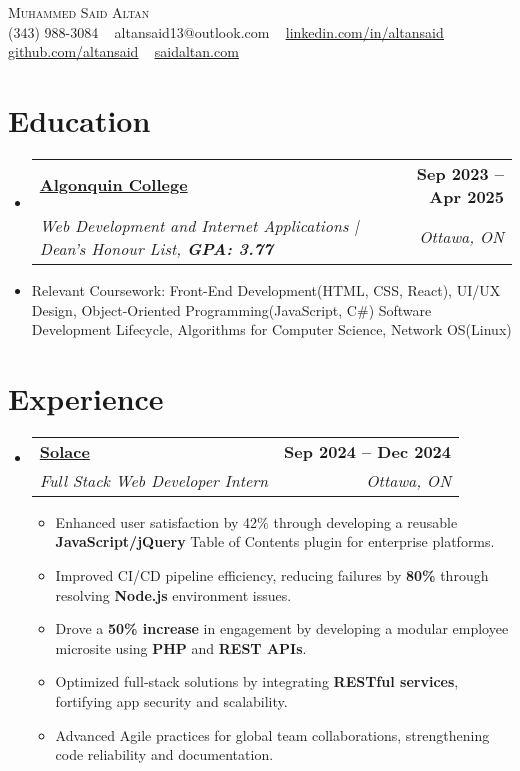 \documentclass[letterpaper, 10pt]{article}
\makeatletter
\newcommand{\resumeItem}[1]{\item\small{{#1 \vspace{0pt}}}}
\newcommand{\resumeSubheading}[4]{
  \vspace{-2pt}\item
    \begin{tabular*}{1.0\textwidth}[t]{l@{\extracolsep{\fill}}r}
      \textbf{#1} & \textbf{\small #2} \\
      \textit{\small#3} & \textit{\small #4} \\
    \end{tabular*}\vspace{-7pt}
}
\newcommand{\resumeItemListStart}{\begin{itemize}}
\newcommand{\resumeItemListEnd}{\end{itemize}\vspace{-5pt}}
\newcommand{\resumeSubHeadingListStart}{\begin{itemize}[leftmargin=0.0in, label={}]}
\newcommand{\resumeSubHeadingListEnd}{\end{itemize}}
\makeatother
\begin{document}
\begin{center}
    {\Large \scshape Muhammed Said Altan} \\[2mm]
    \footnotesize
    (343) 988-3084 ~ 
    altansaid13@outlook.com ~ 
    \underline{\href{https://www.linkedin.com/in/altansaid/}{linkedin.com/in/altansaid}} ~ 
    \underline{\href{https://github.com/altansaid}{github.com/altansaid}} ~ 
    \underline{\href{https://saidaltan.com?utm_source=canonical\&utm_medium=resume\&utm_campaign=job_application}{saidaltan.com}}
    \vspace{-10pt}
\end{center}

\section{Education}
  \resumeSubHeadingListStart
    \resumeSubheading
      {\href{https://www.algonquincollege.com/sat/program/web-development-internet-applications/}{Algonquin College}}{Sep 2023 -- Apr 2025}
      {Web Development and Internet Applications | Dean's Honour List, \textbf{GPA: 3.77}}{Ottawa, ON}
      \resumeItem{Relevant Coursework: Front-End Development(HTML, CSS, React), UI/UX Design, Object-Oriented Programming(JavaScript, C\#) Software Development Lifecycle, Algorithms for Computer Science, Network OS(Linux)} 
  \resumeSubHeadingListEnd
\vspace{-10pt}

\section{Experience}
\resumeSubHeadingListStart
\resumeSubheading
{\href{https://solace.com/}{Solace}}{Sep 2024 -- Dec 2024}{Full Stack Web Developer Intern}{Ottawa, ON}
\resumeItemListStart
\resumeItem{Enhanced user satisfaction by 42\% through developing a reusable \textbf{JavaScript/jQuery} Table of Contents plugin for enterprise platforms.}
\resumeItem{Improved CI/CD pipeline efficiency, reducing failures by \textbf{80\%} through resolving \textbf{Node.js} environment issues.}
\resumeItem{Drove a \textbf{50\% increase} in engagement by developing a modular employee microsite using \textbf{PHP} and \textbf{REST APIs}.}
\resumeItem{Optimized full-stack solutions by integrating \textbf{RESTful services}, fortifying app security and scalability.}
\resumeItem{Advanced Agile practices for global team collaborations, strengthening code reliability and documentation.}
\resumeItemListEnd
\resumeSubHeadingListEnd
  
\end{document}
